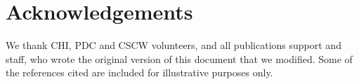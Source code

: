 \documentclass{ubicomp2013}
\begin{document}
\section{Acknowledgements}
We thank CHI, PDC and CSCW volunteers, and all publications support and staff, who wrote the original version of this document that we modified.  Some of the references cited are included for illustrative purposes only.

\nocite{example-journal,example-abstracts,example-conference2}



\end{document}

